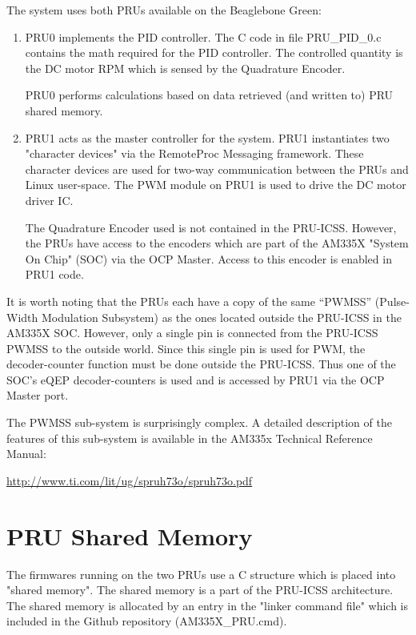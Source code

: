 The system uses both PRUs available on the Beaglebone Green:

\begin{enumerate}
\item 

PRU0 implements the PID controller.  The C code in file PRU\_PID\_0.c contains
the math required for the PID controller.  The controlled quantity is the DC motor RPM which is sensed by the Quadrature Encoder.

PRU0 performs calculations based on data retrieved (and written to) PRU shared memory.
\item 
PRU1 acts as the master controller for the system.  PRU1 instantiates two "character devices" via the RemoteProc Messaging framework.  These character devices are used for two-way communication between the PRUs and Linux user-space.  The PWM module on PRU1 is used to drive the DC motor driver IC.

The Quadrature Encoder used is not contained in the PRU-ICSS.  However, the PRUs have access to the encoders which are part of the AM335X "System On Chip" (SOC) via the OCP Master.  Access to this encoder is enabled in PRU1 code.
\end{enumerate}

It is worth noting that the PRUs each have a copy of the same ``PWMSS'' (Pulse-Width Modulation Subsystem) as the ones located outside the PRU-ICSS in the AM335X SOC.  However, only a single pin is connected from the PRU-ICSS PWMSS to the outside world.  Since this single pin is used for PWM, the decoder-counter function must be done outside the PRU-ICSS. Thus one of the SOC's eQEP decoder-counters is used and is accessed by PRU1 via the OCP Master port.

The PWMSS sub-system is surprisingly complex.  A detailed description of the features of this sub-system is available in the AM335x Technical Reference Manual:

\url{http://www.ti.com/lit/ug/spruh73o/spruh73o.pdf}

\section{PRU Shared Memory}

The firmwares running on the two PRUs use a C structure which is placed into "shared memory".  The shared memory is a part of the PRU-ICSS architecture.  The shared memory is allocated by an entry in the "linker command file" which is included in the Github repository (AM335X\_PRU.cmd).

